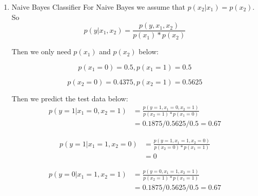 \documentclass[12pt]{article}
\begin{document}
\begin{enumerate}
    
    \item Naive Bayes Classifier
    For Naive Bayes we assume that $p(x_2|x_1) = p(x_2)$. So
    \begin{equation}
    p(y|x_1, x_2) =  \frac{p(y,x_1,x_2)}{p(x_1) * p(x_2)}
    \end{equation}
    
    Then we only need $p(x_1)$ and $p(x_2)$ below:
    
    \begin{equation}
    p(x_1 = 0) = 0.5 , p(x_1 = 1) = 0.5
    \end{equation}
    
    \begin{equation}
    p(x_2 = 0) = 0.4375 , p(x_2 = 1) = 0.5625
    \end{equation}
    
    Then we predict the test data below:
    \begin{equation}
        \begin{split}
            p(y = 1|x_1 = 0, x_2 = 1) &= \frac{p(y = 1,x_1 = 0,x_2 = 1)}{p(x_2 = 1) * p(x_1 = 0)}\\
            &= 0.1875/0.5625/0.5 = 0.67
        \end{split}
    \end{equation}

    \begin{equation}
        \begin{split}
            p(y = 1|x_1 = 1, x_2 = 0) &=  \frac{p(y = 1,x_1 = 1,x_2 = 0)}{p(x_2 = 0) * p(x_1 = 1)}\\
            &= 0
        \end{split}
    \end{equation}

    \begin{equation}
        \begin{split}
            p(y = 0|x_1 = 1, x_2 = 1) &=  \frac{p(y = 0,x_1 = 1,x_2 = 1)}{p(x_2 = 1) * p(x_1 = 1)}\\
            &= 0.1875/0.5625/0.5 = 0.67
        \end{split}
    \end{equation}
      
    
\end{enumerate}
\end{document}
